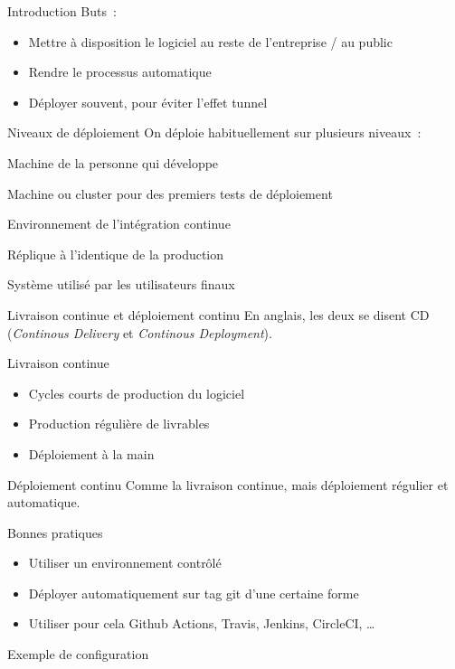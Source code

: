 \begin{frame}{Introduction}
  Buts~:
  \begin{itemize}[<+->]
    \item Mettre à disposition le logiciel au reste de l'entreprise / au public
    \item Rendre le processus automatique
    \item Déployer souvent, pour éviter l'effet tunnel
  \end{itemize}
\end{frame}

\begin{frame}{Niveaux de déploiement}
  On déploie habituellement sur plusieurs niveaux~:

  \begin{description}[<+->]
    \item[Local] Machine de la personne qui développe
    \item[Développement] Machine ou cluster pour des premiers tests de déploiement
    \item[Intégration] Environnement de l'intégration continue
    \item[Staging] Réplique à l'identique de la production
    \item[Production] Système utilisé par les utilisateurs finaux
  \end{description}
\end{frame}

\begin{frame}{Livraison continue et déploiement continu}
  En anglais, les deux se disent CD (\emph{Continous Delivery} et \emph{Continous Deployment}).

  \begin{block}{Livraison continue}
    \begin{itemize}[<+->]
      \item Cycles courts de production du logiciel
      \item Production régulière de livrables
      \item Déploiement à la main
    \end{itemize}
  \end{block}

  \begin{block}{Déploiement continu}
    Comme la livraison continue, mais déploiement régulier et automatique.
  \end{block}
\end{frame}

\begin{frame}{Bonnes pratiques}
  \begin{itemize}[<+->]
    \item Utiliser un environnement contrôlé
    \item Déployer automatiquement sur tag git d'une certaine forme
    \item Utiliser pour cela Github Actions, Travis, Jenkins, CircleCI, …
  \end{itemize}
\end{frame}

\begin{frame}{Exemple de configuration}
\end{frame}
